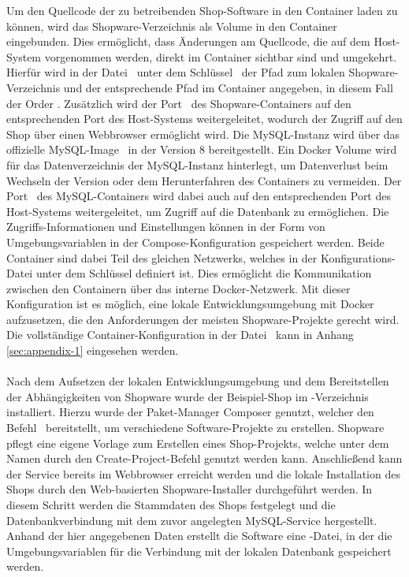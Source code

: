 Um den Quellcode der zu betreibenden Shop-Software in den Container laden zu können, wird das Shopware-Verzeichnis als
Volume in den Container eingebunden.
Dies ermöglicht, dass Änderungen am Quellcode, die auf dem Host-System vorgenommen werden, direkt im Container sichtbar
sind und umgekehrt.
Hierfür wird in der Datei\  unter dem Schlüssel\  der Pfad zum
lokalen Shopware-Verzeichnis und der entsprechende Pfad im Container angegeben, in diesem Fall der Order
.
Zusätzlich wird der Port\  des Shopware-Containers auf den entsprechenden Port des Host-Systems
weitergeleitet, wodurch der Zugriff auf den Shop über einen Webbrowser ermöglicht wird.
Die MySQL-Instanz wird über das offizielle MySQL-Image\  in der Version 8 bereitgestellt.
Ein Docker Volume wird für das Datenverzeichnis der MySQL-Instanz hinterlegt, um Datenverlust beim Wechseln der Version
oder dem Herunterfahren des Containers zu vermeiden.
Der Port\  des MySQL-Containers wird dabei auch auf den entsprechenden Port des Host-Systems
weitergeleitet, um Zugriff auf die Datenbank zu ermöglichen.
Die Zugriffs-Informationen und Einstellungen können in der Form von Umgebungsvariablen in der
Compose-Konfiguration gespeichert werden.
Beide Container sind dabei Teil des gleichen Netzwerks, welches in der Konfigurations-Datei unter dem Schlüssel
 definiert ist.
Dies ermöglicht die Kommunikation zwischen den Containern über das interne Docker-Netzwerk.
Mit dieser Konfiguration ist es möglich, eine lokale Entwicklungsumgebung mit Docker aufzusetzen, die den Anforderungen
der meisten Shopware-Projekte gerecht wird.
Die vollständige Container-Konfiguration in der Datei\  kann in Anhang
\ref{sec:appendix-1} eingesehen werden.
\\\\
Nach dem Aufsetzen der lokalen Entwicklungsumgebung und dem Bereitstellen der Abhängigkeiten von Shopware wurde der
Beispiel-Shop im -Verzeichnis installiert.
Hierzu wurde der Paket-Manager Composer genutzt, welcher den Befehl\  bereitstellt,
um verschiedene Software-Projekte zu erstellen.
Shopware pflegt eine eigene Vorlage zum Erstellen eines Shop-Projekts, welche unter dem Namen
 durch den Create-Project-Befehl genutzt werden kann.
Anschließend kann der Service bereits im Webbrowser erreicht werden und die lokale Installation des Shops durch den
Web-basierten Shopware-Installer durchgeführt werden.
In diesem Schritt werden die Stammdaten des Shops festgelegt und die Datenbankverbindung mit dem zuvor angelegten
MySQL-Service hergestellt.
Anhand der hier angegebenen Daten erstellt die Software eine -Datei, in der die Umgebungsvariablen
für die Verbindung mit der lokalen Datenbank gespeichert werden.

